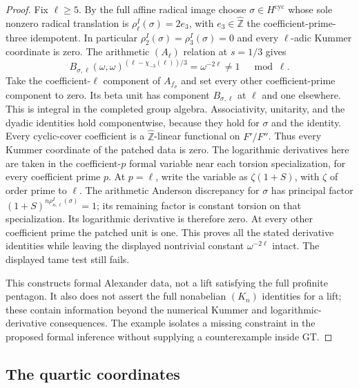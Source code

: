 \begin{proof}
Fix $\ell\ge5$. By the full affine radical image choose
$\sigma\in H^{\mathrm{cyc}}$ whose sole nonzero radical
translation is $\rho_\ell^I(\sigma)=2e_3$, with
$e_3\in\widehat{\mathbb Z}$ the coefficient-prime-three
idempotent. In particular $\rho_2^I(\sigma)=\rho_3^I(\sigma)=0$
and every $\ell$-adic Kummer coordinate is zero.
The arithmetic $(A_\ell)$ relation at $s=1/3$ gives
\[
 B_{\sigma,\ell}(\omega,\omega)^{
          (\ell-\chi_{-3}(\ell))/3}=\omega^{-2\ell}\ne1
 \quad\bmod\ell.
\]
Take the coefficient-$\ell$ component of $A_{f_\sigma}$ and
set every other coefficient-prime component to zero.
Its beta unit has component $B_{\sigma,\ell}$ at $\ell$ and
one elsewhere. This is integral in the completed group algebra.
Associativity, unitarity, and the dyadic identities hold
componentwise, because they hold for $\sigma$ and the identity.
Every cyclic-cover coefficient is a
$\widehat{\mathbb Z}$-linear functional on $F'/F''$.
Thus every Kummer coordinate of the patched data is zero.
The logarithmic derivatives here are taken in the coefficient-$p$
formal variable near each torsion specialization, for every
coefficient prime $p$. At $p=\ell$, write the variable as
$\zeta(1+S)$, with $\zeta$ of order prime to $\ell$.
The arithmetic Anderson discrepancy for $\sigma$ has principal
factor $(1+S)^{n\rho_{n,\ell}^I(\sigma)}=1$; its remaining
factor is constant torsion on that specialization.
Its logarithmic derivative is therefore zero. At every other
coefficient prime the patched unit is one. This proves all the
stated derivative identities while leaving the displayed
nontrivial constant $\omega^{-2\ell}$ intact.
The displayed tame test still fails.

This constructs formal Alexander data, not a lift satisfying the
full profinite pentagon. It also does not assert the full
nonabelian $(K_n)$ identities for a lift; these contain information
beyond the numerical Kummer and logarithmic-derivative consequences.
The example isolates a missing constraint in the proposed formal
inference without supplying a counterexample inside GT.
\end{proof}

\subsection{The quartic coordinates}


